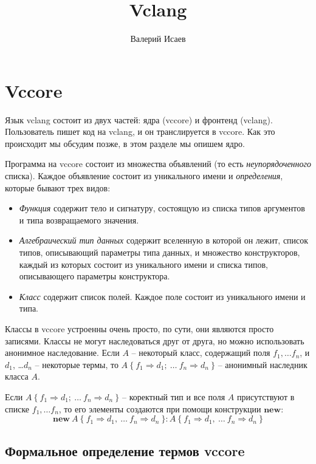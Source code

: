 \documentclass{amsart}
\theoremstyle{definition}
\theoremstyle{remark}
\newcommand{\red}{\Rightarrow}
\numberwithin{figure}{section}
\begin{document}
\title{Vclang}

\author{Валерий Исаев}


\maketitle

\section{Vccore}

Язык vclang состоит из двух частей: ядра (vccore) и фронтенд (vclang).
Пользователь пишет код на vclang, и он транслируется в vccore.
Как это происходит мы обсудим позже, в этом разделе мы опишем ядро.

Программа на vccore состоит из множества объявлений (то есть \emph{неупорядоченного} списка).
Каждое объявление состоит из уникального имени и \emph{определения}, которые бывают трех видов:
\begin{itemize}
\item \emph{Функция} содержит тело и сигнатуру, состоящую из списка типов аргументов и типа возвращаемого значения.
\item \emph{Алгебраический тип данных} содержит вселенную в которой он лежит, список типов, описывающий параметры типа данных, и множество конструкторов, каждый из которых состоит из уникального имени и списка типов, описывающего параметры конструктора.
\item \emph{Класс} содержит список полей. Каждое поле состоит из уникального имени и типа.
\end{itemize}
Классы в vccore устроенны очень просто, по сути, они являются просто записями.
Классы не могут наследоваться друг от друга, но можно использовать анонимное наследование.
Если $A$ -- некоторый класс, содержащий поля $f_1, \ldots f_n$, и $d_1$, \ldots $d_n$ -- некоторые термы, то $A\ \{\ f_1 \red d_1;\ \ldots\ f_n \red d_n\ \}$ -- анонимный наследник класса $A$.

Если $A\ \{\ f_1 \red d_1;\ \ldots\ f_n \red d_n\ \}$ -- коректный тип и все поля $A$ присутствуют в списке $f_1, \ldots f_n$, то его элементы создаются при помощи конструкции $\mathbf{new}$:
\[ \mathbf{new}\ A\ \{\ f_1 \red d_1,\ \ldots\ f_n \red d_n\ \} : A\ \{\ f_1 \red d_1,\ \ldots\ f_n \red d_n\ \} \]

\subsection{Формальное определение термов vccore}
\end{document}
